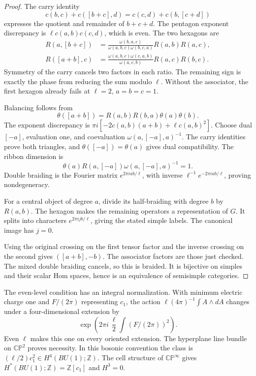 \begin{proof}
The carry identity
\[
 c(b,c)+c([b+c],d)=c(c,d)+c(b,[c+d])
\]
expresses the quotient and remainder of $b+c+d$.
The pentagon exponent discrepancy is
$\ell c(a,b)c(c,d)$, which is even.
The two hexagons are
\[
 \begin{split}
 R(a,[b+c])
 &=\frac{\omega(b,a,c)}
 {\omega(a,b,c)\omega(b,c,a)}R(a,b)R(a,c),\\
 R([a+b],c)
 &=\frac{\omega(a,b,c)\omega(c,a,b)}
 {\omega(a,c,b)}R(a,c)R(b,c).
 \end{split}
\]
Symmetry of the carry cancels two factors in each ratio.
The remaining sign is exactly the phase from reducing
the sum modulo $\ell$. Without the associator, the first
hexagon already fails at $\ell=2$, $a=b=c=1$.

Balancing follows from
\[
 \theta([a+b])=R(a,b)R(b,a)\theta(a)\theta(b).
\]
The exponent discrepancy is
$\pi i[-2c(a,b)(a+b)+\ell c(a,b)^2]$.
Choose dual $[-a]$, evaluation one, and coevaluation
$\omega(a,[-a],a)^{-1}$.
The carry identities prove both triangles, and
$\theta([-a])=\theta(a)$ gives dual compatibility.
The ribbon dimension is
\[
 \theta(a)R(a,[-a])\omega(a,[-a],a)^{-1}=1.
\]
Double braiding is the Fourier matrix
$e^{2\pi iab/\ell}$, with inverse
$\ell^{-1}e^{-2\pi iab/\ell}$, proving nondegeneracy.

For a central object of degree $a$, divide its
half-braiding with degree $b$ by $R(a,b)$.
The hexagon makes the remaining operators a representation
of $G$. It splits into characters
$e^{2\pi ijb/\ell}$, giving the stated simple labels.
The canonical image has $j=0$.

Using the original crossing on the first tensor factor
and the inverse crossing on the second gives
$([a+b],-b)$. The associator factors are those just checked.
The mixed double braiding cancels, so this is braided.
It is bijective on simples and their scalar Hom spaces,
hence is an equivalence of semisimple categories.
\end{proof}

The even-level condition has an integral normalization.
With minimum electric charge one and $F/(2\pi)$ representing
$c_1$, the action $\ell(4\pi)^{-1}\int A\wedge dA$
changes under a four-dimensional extension by
\[
 \exp\left(2\pi i\,\frac\ell2
                  \int(F/(2\pi))^2\right).
\]
Even $\ell$ makes this one on every oriented extension.
The hyperplane line bundle on $\mathbb{CP}^2$
proves necessity. In this bosonic convention the class is
$(\ell/2)c_1^2\in H^4(BU(1);\mathbb Z)$.
The cell structure of $\mathbb{CP}^\infty$ gives
$H^*(BU(1);\mathbb Z)=\mathbb Z[c_1]$ and $H^3=0$.

